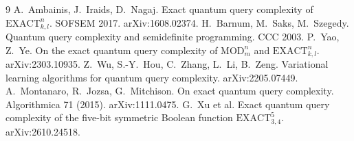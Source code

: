 \documentclass[11pt]{article}
\theoremstyle{remark}
\newcommand{\EX}[3]{\mathrm{EXACT}_{#1,#2}^{#3}}
\begin{document}
\begin{thebibliography}{9}
 A.~Ambainis, J.~Iraids, D.~Nagaj. Exact quantum query complexity of $\EX{k}{l}{n}$.
SOFSEM 2017. arXiv:1608.02374.
 H.~Barnum, M.~Saks, M.~Szegedy. Quantum query complexity and semidefinite programming.
CCC 2003.
 P.~Yao, Z.~Ye. On the exact quantum query complexity of $\mathrm{MOD}_m^n$ and $\EX{k}{l}{n}$.
arXiv:2303.10935.
 Z.~Wu, S.-Y.~Hou, C.~Zhang, L.~Li, B.~Zeng. Variational learning algorithms for quantum
query complexity. arXiv:2205.07449.
 A.~Montanaro, R.~Jozsa, G.~Mitchison. On exact quantum query complexity. Algorithmica 71
(2015). arXiv:1111.0475.
 G.~Xu et al. Exact quantum query complexity of the five-bit symmetric Boolean function
$\mathrm{EXACT}^5_{3,4}$. arXiv:2610.24518.
\end{thebibliography}
\end{document}
